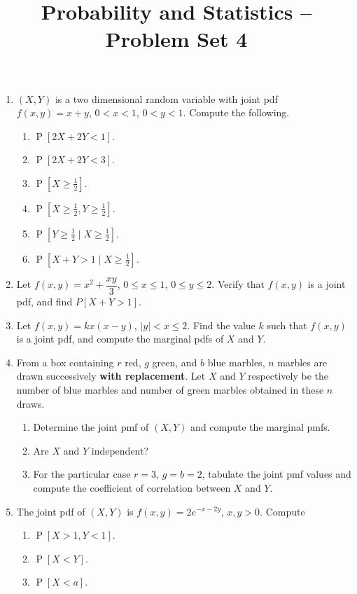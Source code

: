 \documentclass[svgnames]{amsart}
\title[]{Probability and Statistics -- Problem Set 4}
\DeclareMathOperator{\Prob}{P}
\begin{document}
\maketitle
\begin{enumerate}[leftmargin=*]
\item $(X, Y)$ is a two dimensional random variable with joint pdf $f(x, y) = x + y$, $0 < x < 1$, $0 < y < 1$. Compute the following.
\begin{enumerate}
	\item $\Prob[2X + 2Y < 1]$.
	\item $\Prob[2X + 2Y < 3]$.
	\item $\Prob[X \ge \frac 1 2]$.
	\item $\Prob[X \ge \frac 1 2, Y \ge \frac 1 2]$.
	\item $\Prob[Y \ge \frac 1 2 \mid X \ge \frac 1 2]$.
	\item $\Prob[X + Y > 1 \mid X \ge \frac 1 2]$.
\end{enumerate}

\item Let $f(x, y) = x^2 + \dfrac{xy}{3}$, $0 \le x \le 1$, $0 \le y \le 2$. Verify that $f(x, y)$ is a joint pdf, and find $P[X + Y > 1]$.

\item Let $f(x, y) = kx(x - y)$, $|y| < x \le 2$. Find the value $k$ such that $f(x, y)$ is a joint pdf, and compute the marginal pdfs of $X$ and $Y$.

\item From a box containing $r$ red, $g$ green, and $b$ blue marbles, $n$ marbles are drawn successively \textbf{with replacement}. Let $X$ and $Y$ respectively be the number of blue marbles and number of green marbles obtained in these $n$ draws.
\begin{enumerate}
	\item Determine the joint pmf of $(X, Y)$ and compute the marginal pmfs.
	\item Are $X$ and $Y$ independent?
	\item For the particular case $r = 3$, $g = b = 2$, tabulate the joint pmf values and compute the coefficient of correlation between $X$ and $Y$.
\end{enumerate}

\item The joint pdf of $(X, Y)$ is $f(x, y) = 2 e^{-x - 2y}$, $x, y > 0$. Compute
\begin{enumerate}
\item $\Prob[X > 1, Y < 1]$.
\item $\Prob[X < Y]$.
\item $\Prob[X < a]$.
\end{enumerate}


\end{enumerate}
\end{document}
